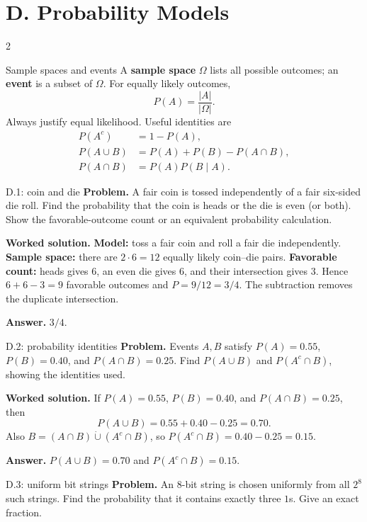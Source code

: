 \documentclass[10pt]{article}
\newcommand{\term}[1]{\textbf{\color{CoreNavy}#1}}
\begin{document}
\section*{D. Probability Models}
\begin{multicols}{2}
\begin{definitionbox}{Sample spaces and events}
A \term{sample space} $\Omega$ lists all possible outcomes; an \term{event}
is a subset of $\Omega$. For equally likely outcomes,
\[
P(A)=\frac{|A|}{|\Omega|}.
\]
Always justify equal likelihood. Useful identities are
\begin{align*}
P(A^c)&=1-P(A),\\
P(A\cup B)&=P(A)+P(B)-P(A\cap B),\\
P(A\cap B)&=P(A)P(B\mid A).
\end{align*}
\end{definitionbox}

\begin{workedbox}{D.1: coin and die}
\textbf{Problem.} A fair coin is tossed independently of a fair six-sided die roll. Find the probability that the coin is heads or the die is even (or both). Show the favorable-outcome count or an equivalent probability calculation.

\textbf{Worked solution.} \textbf{Model:} toss a fair coin and roll a fair die independently.
\textbf{Sample space:} there are $2\cdot6=12$ equally likely coin--die pairs.
\textbf{Favorable count:} heads gives $6$, an even die gives $6$, and their
intersection gives $3$. Hence $6+6-3=9$ favorable outcomes and
$P=9/12=3/4$. The subtraction removes the duplicate intersection.

\textbf{Answer.} $3/4$.
\end{workedbox}

\begin{workedbox}{D.2: probability identities}
\textbf{Problem.} Events $A,B$ satisfy $P(A)=0.55$, $P(B)=0.40$, and $P(A\cap B)=0.25$. Find $P(A\cup B)$ and $P(A^c\cap B)$, showing the identities used.

\textbf{Worked solution.} If $P(A)=0.55$, $P(B)=0.40$, and $P(A\cap B)=0.25$, then
\[
P(A\cup B)=0.55+0.40-0.25=0.70.
\]
Also $B=(A\cap B)\mathbin{\dot\cup}(A^c\cap B)$, so
$P(A^c\cap B)=0.40-0.25=0.15$.

\textbf{Answer.} $P(A\cup B)=0.70$ and $P(A^c\cap B)=0.15$.
\end{workedbox}

\begin{workedbox}{D.3: uniform bit strings}
\textbf{Problem.} An $8$-bit string is chosen uniformly from all $2^8$ such strings. Find the probability that it contains exactly three $1$s. Give an exact fraction.


\end{workedbox}
\end{multicols}
\end{document}

